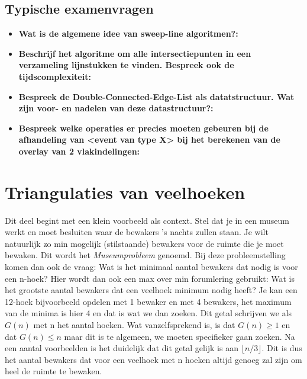 \documentclass[12pt,a4paper]{article}
\begin{document}
	\subsection{Typische examenvragen}
	\begin{itemize}
		\item \textbf{Wat is de algemene idee van sweep-line algoritmen?:}\\
		\item \textbf{Beschrijf het algoritme om alle intersectiepunten in een verzameling lijnstukken te vinden. Bespreek ook de tijdscomplexiteit:}\\
		\item \textbf{Bespreek de Double-Connected-Edge-List als datatstructuur. Wat zijn voor- en nadelen van deze datastructuur?:}\\
		\item \textbf{Bespreek welke operaties er precies moeten gebeuren bij de afhandeling van <event van type X> bij het berekenen van de overlay van 2 vlakindelingen:}\\
	\end{itemize}
	
	
	\section{Triangulaties van veelhoeken}
	Dit deel begint met een klein voorbeeld als context. Stel dat je in een museum werkt en moet besluiten waar de bewakers 's nachts zullen staan. Je wilt natuurlijk zo min mogelijk (stilstaande) bewakers voor de ruimte die je moet bewaken. Dit wordt het \textit{Museumprobleem} genoemd. Bij deze probleemstelling komen dan ook de vraag: Wat is het minimaal aantal bewakers dat nodig is voor een n-hoek? Hier wordt dan ook een max over min forumlering gebruikt: Wat is het grootste aantal bewakers dat een veelhoek minimum nodig heeft? Je kan een 12-hoek bijvoorbeeld opdelen met 1 bewaker en met 4 bewakers, het maximum van de minima is hier 4 en dat is wat we dan zoeken. Dit getal schrijven we als $G(n)$ met n het aantal hoeken. Wat vanzelfsprekend is, is dat $G(n) \geq 1$ en dat $G(n) \leq n$ maar dit is te algemeen, we moeten specifieker gaan zoeken. Na een aantal voorbeelden is het duidelijk dat dit getal gelijk is aan $\lfloor n/3\rfloor$. Dit is dus het aantal bewakers dat voor een veelhoek met n hoeken altijd genoeg zal zijn om heel de ruimte te bewaken. 
	
\end{document}
